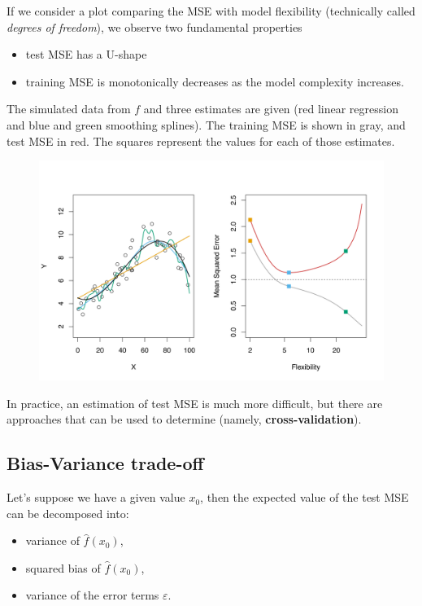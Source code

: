 \documentclass[11pt]{article}
\makeatletter
\def\maxwidth{\ifdim\Gin@nat@width>\linewidth\linewidth
    \else\Gin@nat@width\fi}
\let\Oldincludegraphics\includegraphics
\renewcommand{\includegraphics}[1]{\Oldincludegraphics[width=.8\maxwidth]{#1}}
\providecommand{\tightlist}{%
      \setlength{\itemsep}{0pt}\setlength{\parskip}{0pt}}
\makeatother
\begin{document}
    If we consider a plot comparing the MSE with model flexibility
(technically called \emph{degrees of freedom}), we observe two
fundamental properties

\begin{itemize}
\tightlist
\item
  test MSE has a U-shape
\item
  training MSE is monotonically decreases as the model complexity
  increases.
\end{itemize}

The simulated data from \(f\) and three estimates are given (red linear
regression and blue and green smoothing splines). The training MSE is
shown in gray, and test MSE in red. The squares represent the values for each of those
estimates.

\begin{figure}[h!]
    \centering
    \includegraphics{2.9.png}
\end{figure}

In practice, an estimation of test MSE is much more difficult, but there
are approaches that can be used to determine (namely,
\textbf{cross-validation}).

    \hypertarget{bias-variance-trade-off}{%
\subsection{Bias-Variance trade-off}\label{bias-variance-trade-off}}

Let's suppose we have a given value \(x_0\), then the expected value of
the test MSE can be decomposed into:

\begin{itemize}
\tightlist
\item
  variance of \(\hat{f}(x_0)\),
\item
  squared bias of \(\hat{f}(x_0)\),
\item
  variance of the error terms \(\varepsilon\).
\end{itemize}
\end{document}
